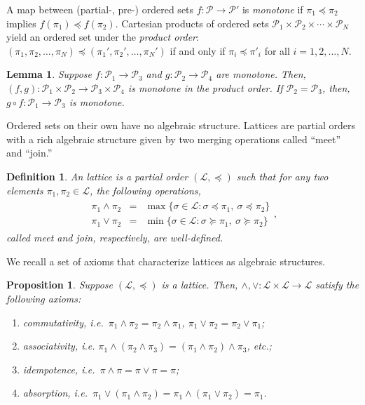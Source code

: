 \documentclass[conference]{ieeeconf}
\renewcommand{\P}{\mathcal{P}}
\renewcommand{\L}{\mathcal{L}}
\newcommand{\join}{\vee}
\newcommand{\meet}{\wedge}
\newtheorem{lemma}{Lemma}
\newtheorem{proposition}{Proposition}
\newtheorem{definition}{Definition}
\begin{document}
A map between (partial-, pre-) ordered sets $f: \P \to \P'$ is \emph{monotone} if $\pi_1 \preceq \pi_2$ implies $f(\pi_1) \preceq f(\pi_2)$. Cartesian products of ordered sets $\P_1 \times \P_2 \times \cdots \times \P_N$ yield an ordered set under the \emph{product order}: $(\pi_1, \pi_2, \dots, \pi_N) \preceq (\pi_1', \pi_2', \dots, \pi_N')$ if and only if $\pi_i \preceq \pi'_i$ for all $i = 1,2,\dots, N$.

\begin{lemma} \label{lem:compose-produt}
    Suppose $f: \P_1 \to \P_3$ and $g: \P_2 \to \P_4$ are monotone.  Then, $(f,g): \P_1 \times \P_2 \to \P_3 \times \P_4$ is monotone in the product order. If $\P_2 = \P_3$, then, $g \circ f: \P_1 \to \P_3$ is monotone.
\end{lemma}

Ordered sets on their own have no algebraic structure. Lattices are partial orders with a rich algebraic structure given by two merging operations called ``meet'' and ``join.''
 
\begin{definition} \label{def:lattice}
    An \emph{lattice} is a partial order $(\L, \preceq)$ such that for any two elements $\pi_1, \pi_2 \in \L$, the following operations,
    \begin{align*}
        \begin{aligned}
        \pi_1 \meet \pi_2 &=& \max\{ \sigma \in \L: \sigma \preceq \pi_1,~\sigma \preceq \pi_2 \} \\
        \pi_1 \join \pi_2 &=& \min\{ \sigma \in \L: \sigma \succeq \pi_1,~\sigma \succeq \pi_2 \}        
        \end{aligned},
    \end{align*}
    called \emph{meet} and \emph{join}, respectively, are well-defined. 
\end{definition}

We recall a set of axioms that characterize lattices as algebraic structures.

\begin{proposition} \label{prop:lattice-axiom}
    Suppose $(\L,\preceq)$ is a lattice. Then, $\meet, \join: \L \times \L \to \L$ satisfy the following axioms:
    \begin{enumerate}
        \item \emph{commutativity}, i.e.~$\pi_1 \meet \pi_2 = \pi_2 \meet \pi_1$, $\pi_1 \join \pi_2 = \pi_2 \join \pi_1$;
        \item \emph{associativity}, i.e. {\small $\pi_1 \meet (\pi_2 \meet \pi_3) = (\pi_1 \meet \pi_2) \meet \pi_3$}, etc.;
        \item \emph{idempotence}, i.e.~$\pi \meet \pi = \pi \join \pi =  \pi$;
        \item \emph{absorption}, i.e.~$\pi_1 \join \left( \pi_1 \meet \pi_2 \right) = \pi_1 \meet \left( \pi_1 \join \pi_2 \right) = \pi_1$.
    \end{enumerate}
\end{proposition}
\end{document}
